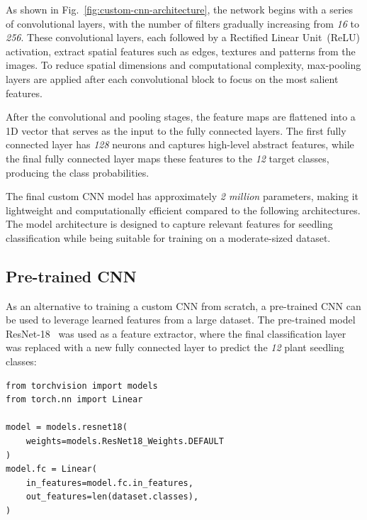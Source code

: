 As shown in Fig.~\ref{fig:custom-cnn-architecture}, the network begins with a series of convolutional layers, with the number of filters gradually increasing from \textit{16} to \textit{256}. These convolutional layers, each followed by a Rectified Linear Unit~(ReLU) activation, extract spatial features such as edges, textures and patterns from the images. To reduce spatial dimensions and computational complexity, max-pooling layers are applied after each convolutional block to focus on the most salient features.

After the convolutional and pooling stages, the feature maps are flattened into a 1D vector that serves as the input to the fully connected layers. The first fully connected layer has \textit{128} neurons and captures high-level abstract features, while the final fully connected layer maps these features to the \textit{12} target classes, producing the class probabilities.

The final custom CNN model has approximately \textit{2 million} parameters, making it lightweight and computationally efficient compared to the following architectures. The model architecture is designed to capture relevant features for seedling classification while being suitable for training on a moderate-sized dataset.

\subsection{Pre-trained CNN}

As an alternative to training a custom CNN from scratch, a pre-trained CNN can be used to leverage learned features from a large dataset. The pre-trained model ResNet-18~\cite{DBLP:journals/corr/HeZRS15} was used as a feature extractor, where the final classification layer was replaced with a new fully connected layer to predict the \textit{12} plant seedling classes:

\begin{minipage}{0.9\linewidth}\begin{lstlisting}[caption={Replacing the final classification layer of a pre-trained ResNet-18 model.},label={lst:pre-trained-cnn}]
from torchvision import models
from torch.nn import Linear

model = models.resnet18(
    weights=models.ResNet18_Weights.DEFAULT
)
model.fc = Linear(
    in_features=model.fc.in_features,
    out_features=len(dataset.classes),
)
\end{lstlisting}\end{minipage}

